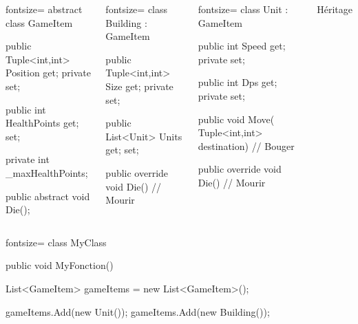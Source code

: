 \begin{frame}[fragile]
    \begin{columns}[c]
        \column{2.3in}
        \begin{csharpcode*}{fontsize=\scriptsize}
abstract class GameItem
{
    public Tuple<int,int> Position
        { get; private set; }

    public int HealthPoints
        { get; set; }

    private int _maxHealthPoints;

    public abstract void Die();
}
        \end{csharpcode*}
        \pause
        \begin{csharpcode*}{fontsize=\scriptsize}
class Building : GameItem
{
    public Tuple<int,int> Size
        { get; private set; }

    public List<Unit> Units
        { get; set; }

    public override void Die()
    {
        // Mourir
    }
}
        \end{csharpcode*}
        \column{2.3in}
        \pause
        \begin{csharpcode*}{fontsize=\scriptsize}
class Unit : GameItem
{
    public int Speed
        { get; private set; }

    public int Dps
        { get; private set; }

    public void Move(
        Tuple<int,int> destination)
    {
        // Bouger
    }

    public override void Die()
    {
        // Mourir
    }
}
        \end{csharpcode*}
        \pause
        \begin{center}{\large Héritage}\end{center}
    \end{columns}
\end{frame}

\begin{frame}[fragile]
  \begin{csharpcode*}{fontsize=\scriptsize}
class MyClass
{
    public void MyFonction()
    {
        List<GameItem> gameItems = new List<GameItem>();

        gameItems.Add(new Unit());
        gameItems.Add(new Building());
    }
}
    \end{csharpcode*}
\end{frame}

